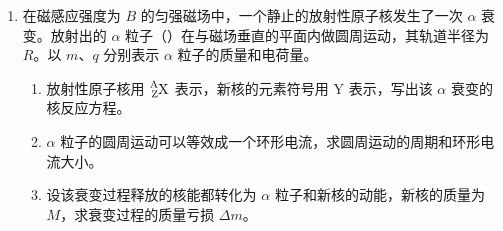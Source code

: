 \documentclass[\gkver]{gaokaozhenti}
\begin{document}
\begin{enumerate}
\begin{enumerate}
	\item
	小球所受电场力 $F$ 的大小。
	\item
	小球的质量 $m$。
	\item
	将电场撤去，小球回到最低点时速度 $v$ 的大小。
\end{enumerate}
\onepicture[align=right, w=4.51cm]{}


\item
在磁感应强度为 $B$ 的匀强磁场中，一个静止的放射性原子核发生了一次 $\alpha$ 衰变。放射出的 $\alpha$ 粒子（）在与磁场垂直的平面内做圆周运动，其轨道半径为 $R$。以 $m$、$q$ 分别表示 $\alpha$ 粒子的质量和电荷量。

\begin{enumerate}
	\item
	放射性原子核用 $\ce{^{A}_{Z}X}$ 表示，新核的元素符号用 Y 表示，写出该 $\alpha$ 衰变的核反应方程。
	\item
	$\alpha$ 粒子的圆周运动可以等效成一个环形电流，求圆周运动的周期和环形电流大小。
	\item
	设该衰变过程释放的核能都转化为 $\alpha$ 粒子和新核的动能，新核的质量为 $M$，求衰变过程的质量亏损 $\Delta m$。
\end{enumerate}

\end{enumerate}
\end{document}
